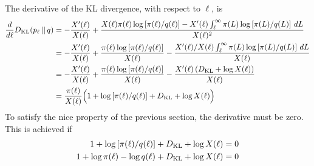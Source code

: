 \documentclass[a4paper, 12pt]{article}
\newcommand{\btheta}{\boldsymbol{\theta}}
\newcommand{\tn}{\textnormal}
\begin{document}
The derivative of the KL divergence, with respect to $\ell$, is
\begin{align}
\frac{d}{d\ell} D_{\rm KL}(p_\ell \,||\, q)
  &= -\frac{X'(\ell)}{X(\ell)}
     + \frac{X(\ell)\pi(\ell)\log\left[\pi(\ell)/q(\ell)\right]
             -X'(\ell)\int_{\ell}^{\infty} \pi(L)
               \log\left[\pi(L)/q(L)\right] \, dL}
            {X(\ell)^2} \\
  &= -\frac{X'(\ell)}{X(\ell)}
     + \frac{\pi(\ell)\log\left[\pi(\ell)/q(\ell)\right]}
            {X(\ell)}
     - \frac{X'(\ell)/X(\ell)\int_{\ell}^{\infty} \pi(L)
               \log\left[\pi(L)/q(L)\right] \, dL}
            {X(\ell)}\\
  &= -\frac{X'(\ell)}{X(\ell)}
     + \frac{\pi(\ell)\log\left[\pi(\ell)/q(\ell)\right]}
            {X(\ell)}
     - \frac{X'(\ell)\left(D_{\rm KL} + \log X(\ell)\right)}
            {X(\ell)} \\
  &= \frac{\pi(\ell)}{X(\ell)}
        \Big(1
             + \log\left[\pi(\ell)/q(\ell)\right]
             + D_{\rm KL} + \log X(\ell)
        \Big)
\end{align}
To satisfy the nice property of the previous section, the derivative
must be zero. This is achieved if
\begin{align}
1 + \log\left[\pi(\ell)/q(\ell)\right]
+ D_{\rm KL} + \log X(\ell) &= 0 \\
1 + \log\pi(\ell) - \log q(\ell)
+ D_{\rm KL} + \log X(\ell) &= 0
\end{align}


\end{document}
